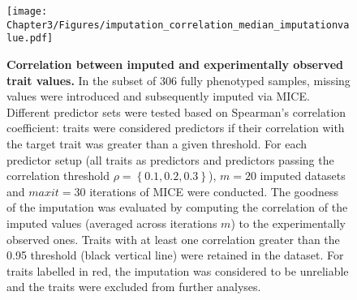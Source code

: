 \begin{figure}[hbtp]
	\centering
	\texttt{[image: Chapter3/Figures/imputation\_correlation\_median\_imputationvalue.pdf]}
	\caption[\textbf{Correlation between imputed and experimentally observed trait values.}]{\textbf{Correlation between imputed and experimentally observed trait values.} In the subset of \num{306} fully phenotyped samples, missing values were introduced and subsequently imputed via MICE. Different predictor sets were tested based on Spearman's correlation coefficient: traits were considered predictors if their correlation with the target trait was greater than a given threshold. For each predictor setup (all traits as predictors and predictors passing the correlation threshold \(\rho =\left\{0.1, 0.2, 0.3\right\}\)), \(m=20\) imputed datasets and \(maxit=30\) iterations of MICE were conducted. The goodness of the imputation was evaluated by computing the correlation of the imputed values (averaged across iterations \(m\)) to the experimentally observed ones. Traits with at least one correlation greater than the \num{0.95} threshold (black vertical line) were retained in the dataset. For traits labelled in red, the imputation was considered to be unreliable and the traits were excluded from further analyses. }
 	\label{fig:mice}
\end{figure}


